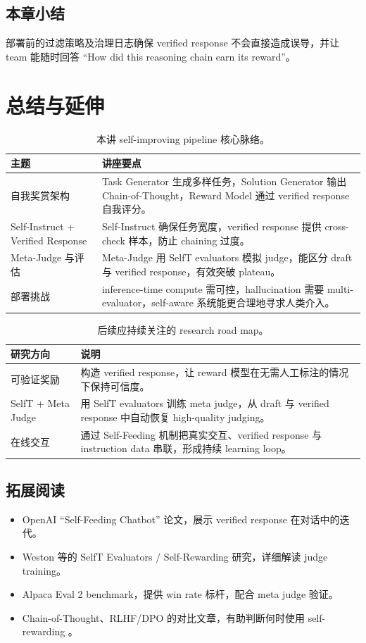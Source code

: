 \documentclass[a4paper]{article}
\begin{document}
\subsection{本章小结}
部署前的过滤策略及治理日志确保 verified response 不会直接造成误导，并让 team 能随时回答 ``How did this reasoning chain earn its reward''。

\section{总结与延伸}
\begin{table}[H]
\centering
\begin{tabular}{p{4.5cm}p{11cm}}
\toprule
主题 & 讲座要点 \\
\midrule
自我奖赏架构 & Task Generator 生成多样任务，Solution Generator 输出 Chain-of-Thought，Reward Model 通过 verified response 自我评分。 \\
Self-Instruct + Verified Response & Self-Instruct 确保任务宽度，verified response 提供 cross-check 样本，防止 chaining 过度。 \\
Meta-Judge 与评估 & Meta-Judge 用 SelfT evaluators 模拟 judge，能区分 draft 与 verified response，有效突破 plateau。 \\
部署挑战 & inference-time compute 需可控，hallucination 需要 multi-evaluator，self-aware 系统能更合理地寻求人类介入。 \\
\bottomrule
\end{tabular}
\caption{本讲 self-improving pipeline 核心脉络。}
\end{table}

\begin{table}[H]
\centering
\begin{tabular}{p{5cm}p{10cm}}
\toprule
研究方向 & 说明 \\
\midrule
可验证奖励 & 构造 verified response，让 reward 模型在无需人工标注的情况下保持可信度。 \\
SelfT + Meta Judge & 用 SelfT evaluators 训练 meta judge，从 draft 与 verified response 中自动恢复 high-quality judging。 \\
在线交互 & 通过 Self-Feeding 机制把真实交互、verified response 与 instruction data 串联，形成持续 learning loop。 \\
\bottomrule
\end{tabular}
\caption{后续应持续关注的 research road map。}
\end{table}

\subsection{拓展阅读}
\begin{itemize}
    \item OpenAI “Self-Feeding Chatbot” 论文，展示 verified response 在对话中的迭代。
    \item Weston 等的 SelfT Evaluators / Self-Rewarding 研究，详细解读 judge training。
    \item Alpaca Eval 2 benchmark，提供 win rate 标杆，配合 meta judge 验证。
    \item Chain-of-Thought、RLHF/DPO 的对比文章，有助判断何时使用 self-rewarding 。
\end{itemize}
\end{document}
